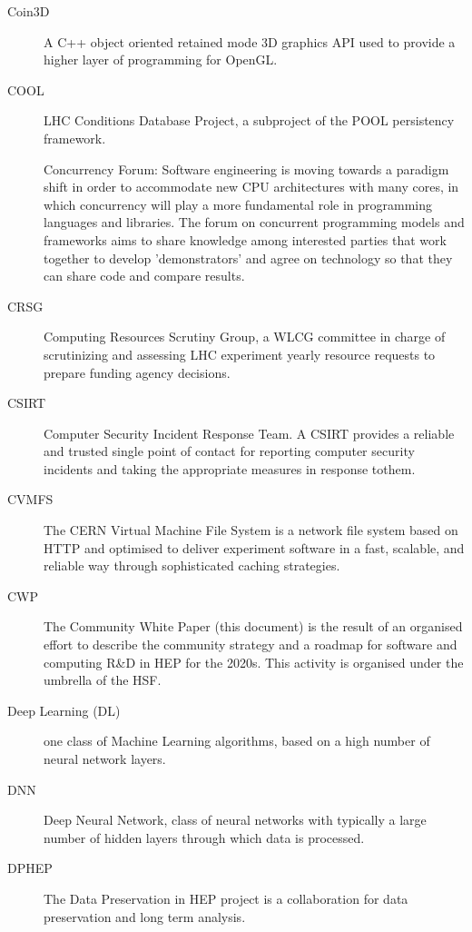 \documentclass[12pt,a4paper]{article}
\begin{document}
\begin{appendices}
\begin{description}
\item[Coin3D] A C++ object oriented retained mode 3D graphics API
used to provide a higher layer of programming for OpenGL.

\item[COOL] LHC Conditions Database Project, a subproject of the POOL persistency framework.

Concurrency Forum: Software engineering is moving towards a paradigm shift in order to accommodate new CPU architectures with many cores, in which concurrency will play a more fundamental role in programming languages and libraries. The forum on concurrent programming models and frameworks aims to share knowledge among interested parties that work together to develop 'demonstrators' and agree on technology so that they can share code and compare results.

\item[CRSG] Computing Resources Scrutiny Group, a WLCG committee in charge of scrutinizing and assessing LHC experiment yearly resource requests to prepare funding agency decisions.

\item[CSIRT] Computer Security Incident Response Team. A CSIRT provides a reliable and trusted single point of contact for reporting computer security incidents and taking the appropriate measures in response tothem.

\item[CVMFS] The CERN Virtual Machine File System is a network file system
based on HTTP and optimised to deliver experiment software in a fast,
scalable, and reliable way through sophisticated caching strategies.

\item[CWP] The Community White Paper (this document) is the result of an
organised effort to describe the community strategy and a roadmap for
software and computing R\&D in HEP for the 2020s. This activity is
organised under the umbrella of the HSF.

\item[Deep Learning (DL)] one class of Machine Learning algorithms, based on a
high number of neural network layers.

\item[DNN] Deep Neural Network, class of neural networks with typically a
large number of hidden layers through which data is processed.

\item[DPHEP] The Data Preservation in HEP project is a collaboration for data
preservation and long term analysis.


\end{description}
\end{appendices}
\end{document}
